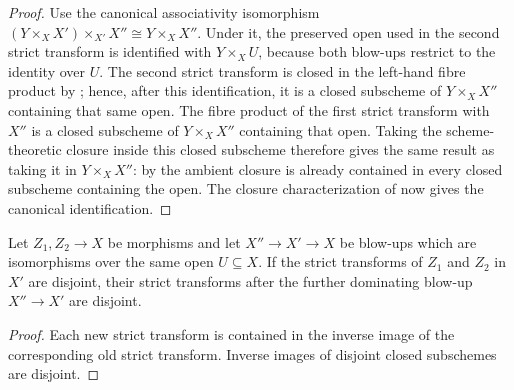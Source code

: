 \begin{proof}
  Use the canonical associativity isomorphism
  $(Y\times_XX')\times_{X'}X''\cong Y\times_XX''$.  Under it, the preserved
  open used in the second strict transform is identified with
  $Y\times_XU$, because both blow-ups restrict to the identity over $U$.
  The second strict transform is closed in the left-hand fibre product by
  ; hence, after this
  identification, it is a closed subscheme of $Y\times_XX''$ containing that
  same open.  The fibre product of the first strict transform with $X''$ is a
  closed subscheme of $Y\times_XX''$ containing that open.  Taking the
  scheme-theoretic closure inside this closed subscheme therefore gives the
  same result as taking it in $Y\times_XX''$: by
   the ambient closure is
  already contained in every closed subscheme containing the open.  The closure
  characterization of
   now gives the
  canonical identification.
\end{proof}

\begin{lemma}
  \label{lemma:nagata-strict-transform-disjoint-dominating}

  Let $Z_1,Z_2\to X$ be morphisms and let $X''\to X'\to X$ be blow-ups
  which are isomorphisms over the same open $U\subseteq X$.  If the strict
  transforms of $Z_1$ and $Z_2$ in $X'$ are disjoint, their strict transforms
  after the further dominating blow-up $X''\to X'$ are disjoint.
\end{lemma}

\begin{proof}
  Each new strict transform is contained in the inverse image of the
  corresponding old strict transform.  Inverse images of disjoint closed
  subschemes are disjoint.
\end{proof}

